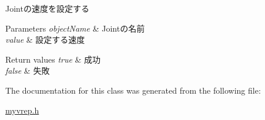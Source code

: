 Jointの速度を設定する　 


\begin{DoxyParams}{Parameters}
{\em object\-Name} & Jointの名前 \\
\hline
{\em value} & 設定する速度\\
\hline
\end{DoxyParams}

\begin{DoxyRetVals}{Return values}
{\em true} & 成功 \\
\hline
{\em false} & 失敗 \\
\hline
\end{DoxyRetVals}


The documentation for this class was generated from the following file\-:\begin{DoxyCompactItemize}
\item 
\hyperlink{myvrep_8h}{myvrep.\-h}\end{DoxyCompactItemize}
